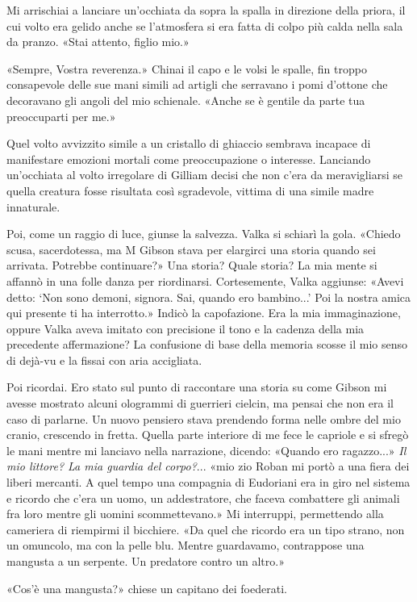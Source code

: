 Mi arrischiai a lanciare un'occhiata da sopra la spalla in direzione
della priora, il cui volto era gelido anche se l'atmosfera si era fatta
di colpo più calda nella sala da pranzo. «Stai attento, figlio mio.»

«Sempre, Vostra reverenza.» Chinai il capo e le volsi le spalle, fin
troppo consapevole delle sue mani simili ad artigli che serravano i pomi
d'ottone che decoravano gli angoli del mio schienale. «Anche se è
gentile da parte tua preoccuparti per me.»

Quel volto avvizzito simile a un cristallo di ghiaccio sembrava incapace
di manifestare emozioni mortali come preoccupazione o interesse.
Lanciando un'occhiata al volto irregolare di Gilliam decisi che non
c'era da meravigliarsi se quella creatura fosse risultata così
sgradevole, vittima di una simile madre innaturale.

Poi, come un raggio di luce, giunse la salvezza. Valka si schiarì la
gola. «Chiedo scusa, sacerdotessa, ma M Gibson stava per elargirci una
storia quando sei arrivata. Potrebbe continuare?» Una storia? Quale
storia? La mia mente si affannò in una folle danza per riordinarsi.
Cortesemente, Valka aggiunse: «Avevi detto: `Non sono demoni, signora.
Sai, quando ero bambino...' Poi la nostra amica qui presente ti ha
interrotto.» Indicò la capofazione. Era la mia immaginazione, oppure
Valka aveva imitato con precisione il tono e la cadenza della mia
precedente affermazione? La confusione di base della memoria scosse il
mio senso di dejà-vu e la fissai con aria accigliata.

Poi ricordai. Ero stato sul punto di raccontare una storia su come
Gibson mi avesse mostrato alcuni ologrammi di guerrieri cielcin, ma
pensai che non era il caso di parlarne. Un nuovo pensiero stava
prendendo forma nelle ombre del mio cranio, crescendo in fretta. Quella
parte interiore di me fece le capriole e si sfregò le mani mentre mi
lanciavo nella narrazione, dicendo: «Quando ero ragazzo...» \emph{Il mio
	littore? La mia guardia del corpo?}... «mio zio Roban mi portò a una
fiera dei liberi mercanti. A quel tempo una compagnia di Eudoriani era
in giro nel sistema e ricordo che c'era un uomo, un addestratore, che
faceva combattere gli animali fra loro mentre gli uomini scommettevano.»
Mi interruppi, permettendo alla cameriera di riempirmi il bicchiere. «Da
quel che ricordo era un tipo strano, non un omuncolo, ma con la pelle
blu. Mentre guardavamo, contrappose una mangusta a un serpente. Un
predatore contro un altro.»

«Cos'è una mangusta?» chiese un capitano dei foederati.

